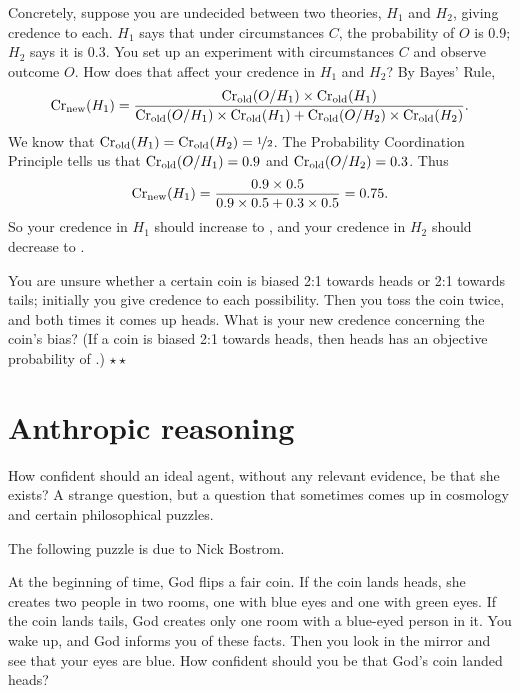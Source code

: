 Concretely, suppose you are undecided between two theories, $H_1$ and
$H_2$, giving credence  to each. $H_1$ says that under
circumstances $C$, the probability of $O$ is 0.9; $H_2$ says it is
0.3. You set up an experiment with circumstances $C$ and observe
outcome $O$. How does that affect your credence in $H_1$ and $H_2$? By
Bayes' Rule,
\[
\text{Cr}_{\text{new}}(H_1) = \frac{\text{Cr}_{\text{old}}(O/H_1) \times
  \text{Cr}_{\text{old}}(H_1)}{\text{Cr}_\text{old}(O/H_1)\times \text{Cr}_\text{old}(H_1) +
  \text{Cr}_\text{old}(O/H_2)\times \text{Cr}_\text{old}(H_2)}.
\]
We know that $\text{Cr}_\text{old}(H_1) = \text{Cr}_\text{old}(H_2) =
\nicefrac{1}{2}$. The Probability Coordination Principle tells us that
$\text{Cr}_{\text{old}}(O/H_1) = 0.9$ and $\text{Cr}_{\text{old}}(O/H_2) = 0.3$. Thus 
\[
\text{Cr}_{\text{new}}(H_1) = \frac{0.9 \times 0.5}{0.9 \times 0.5 + 0.3 \times 0.5} = 0.75.
\]
So your credence in $H_1$ should increase to , and your
credence in $H_2$ should decrease to .



\begin{exercise}
  You are unsure whether a certain coin is biased 2:1 towards heads or
  2:1 towards tails; initially you give credence  to
  each possibility. Then you toss the coin twice, and both times it
  comes up heads. What is your new credence concerning the coin's
  bias? (If a coin is biased 2:1 towards heads, then heads has an
  objective probability of .) $\star\star$
\end{exercise}



\section{Anthropic reasoning}

How confident should an ideal agent, without any relevant evidence, be
that she exists? A strange question, but a question that sometimes comes
up in cosmology and certain philosophical puzzles. 

The following puzzle is due to Nick Bostrom.

\begin{example}\label{ex:godscoin}
  At the beginning of time, God flips a fair coin. If the coin lands
  heads, she creates two people in two rooms, one with blue eyes and
  one with green eyes. If the coin lands tails, God creates only one
  room with a blue-eyed person in it. You wake up, and God informs you
  of these facts. Then you look in the mirror and see that your eyes
  are blue. How confident should you be that God's coin landed heads?
\end{example}

